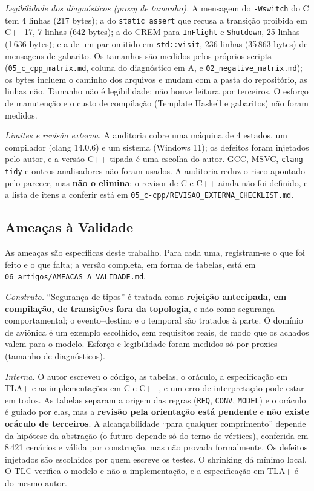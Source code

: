 \documentclass[12pt,a4paper]{article}
\begin{document}
\textit{Legibilidade dos diagnósticos (proxy de tamanho).} A mensagem do \texttt{-Wswitch} do C tem 4 linhas (217 bytes); a do \texttt{static\_assert} que recusa a transição proibida em C++17, 7 linhas (642 bytes); a do CREM para \texttt{InFlight} e \texttt{Shutdown}, 25 linhas (1\,636 bytes); e a de um par omitido em \texttt{std::visit}, 236 linhas (35\,863 bytes) de mensagens de gabarito. Os tamanhos são medidos pelos próprios scripts (\texttt{05\_c\_cpp\_matrix.md}, coluna do diagnóstico em A, e \texttt{02\_negative\_matrix.md}); os bytes incluem o caminho dos arquivos e mudam com a pasta do repositório, as linhas não. Tamanho não é legibilidade: não houve leitura por terceiros. O esforço de manutenção e o custo de compilação (Template Haskell e gabaritos) não foram medidos.

\textit{Limites e revisão externa.} A auditoria cobre uma máquina de 4 estados, um compilador (clang 14.0.6) e um sistema (Windows 11); os defeitos foram injetados pelo autor, e a versão C++ tipada é uma escolha do autor. GCC, MSVC, \texttt{clang-tidy} e outros analisadores não foram usados. A auditoria reduz o risco apontado pelo parecer, mas \textbf{não o elimina}: o revisor de C e C++ ainda não foi definido, e a lista de itens a conferir está em \texttt{05\_c-cpp/REVISAO\_EXTERNA\_CHECKLIST.md}.

\subsection{Ameaças à Validade}

As ameaças são específicas deste trabalho. Para cada uma, registram-se o que foi feito e o que falta; a versão completa, em forma de tabelas, está em \texttt{06\_artigos/AMEACAS\_A\_VALIDADE.md}.

\textit{Construto.} ``Segurança de tipos'' é tratada como \textbf{rejeição antecipada, em compilação, de transições fora da topologia}, e não como segurança comportamental; o evento--destino e o temporal são tratados à parte. O domínio de aviônica é um exemplo escolhido, sem requisitos reais, de modo que os achados valem para o modelo. Esforço e legibilidade foram medidos só por proxies (tamanho de diagnósticos).

\textit{Interna.} O autor escreveu o código, as tabelas, o oráculo, a especificação em TLA+ e as implementações em C e C++, e um erro de interpretação pode estar em todos. As tabelas separam a origem das regras (\texttt{REQ}, \texttt{CONV}, \texttt{MODEL}) e o oráculo é guiado por elas, mas a \textbf{revisão pela orientação está pendente} e \textbf{não existe oráculo de terceiros}. A alcançabilidade ``para qualquer comprimento'' depende da hipótese da abstração (o futuro depende só do terno de vértices), conferida em 8\,421 cenários e válida por construção, mas não provada formalmente. Os defeitos injetados são escolhidos por quem escreve os testes. O shrinking dá mínimo local. O TLC verifica o modelo e não a implementação, e a especificação em TLA+ é do mesmo autor.
\end{document}

